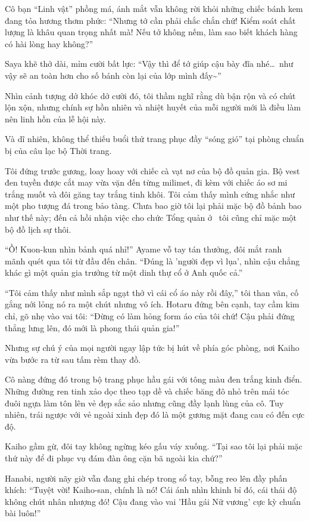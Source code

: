 \documentclass[../main.tex]{subfiles}
\begin{document}
Cô bạn ``Linh vật'' phồng má, ánh mắt vẫn không rời khỏi những chiếc bánh kem đang tỏa hương thơm phức: ``Nhưng tớ cần phải chắc chắn chứ! Kiểm soát chất lượng là khâu quan trọng nhất mà! Nếu tớ không nếm, làm sao biết khách hàng có hài lòng hay không?''

Saya khẽ thở dài, mỉm cười bất lực: ``Vậy thì để tớ giúp cậu bày đĩa nhé\dots\ như vậy sẽ an toàn hơn cho số bánh còn lại của lớp mình đấy\~{}''

Nhìn cảnh tượng dở khóc dở cười đó, tôi thầm nghĩ rằng dù bận rộn và có chút lộn xộn, nhưng chính sự hồn nhiên và nhiệt huyết của mỗi người mới là điều làm nên linh hồn của lễ hội này.

Và dĩ nhiên, không thể thiếu buổi thử trang phục đầy ``sóng gió'' tại phòng chuẩn bị của câu lạc bộ Thời trang.

Tôi đứng trước gương, loay hoay với chiếc cà vạt nơ của bộ đồ quản gia. Bộ vest đen tuyền được cắt may vừa vặn đến từng milimet, đi kèm với chiếc áo sơ mi trắng muốt và đôi găng tay trắng tinh khôi. Tôi cảm thấy mình cứng nhắc như một pho tượng đá trong bảo tàng. Chưa bao giờ tôi lại phải mặc bộ đồ bảnh bao như thế này; đến cả hồi nhận việc cho chức Tổng quản ở \hll\ tôi cũng chỉ mặc một bộ đồ lịch sự thôi.

``Ồ! Kuon-kun nhìn bảnh quá nhỉ!'' Ayame vỗ tay tán thưởng, đôi mắt ranh mãnh quét qua tôi từ đầu đến chân. ``Đúng là 'người đẹp vì lụa', nhìn cậu chẳng khác gì một quản gia trưởng từ một dinh thự cổ ở Anh quốc cả.''

``Tôi cảm thấy như mình sắp ngạt thở vì cái cổ áo này rồi đây,'' tôi than vãn, cố gắng nới lỏng nó ra một chút nhưng vô ích. Hotaru đứng bên cạnh, tay cầm kim chỉ, gõ nhẹ vào vai tôi: ``Đừng có làm hỏng form áo của tôi chứ! Cậu phải đứng thẳng lưng lên, đó mới là phong thái quản gia!''

Nhưng sự chú ý của mọi người ngay lập tức bị hút về phía góc phòng, nơi Kaiho vừa bước ra từ sau tấm rèm thay đồ.

Cô nàng đứng đó trong bộ trang phục hầu gái với tông màu đen trắng kinh điển. Những đường ren tinh xảo dọc theo tạp dề và chiếc băng đô nhỏ trên mái tóc đuôi ngựa làm tôn lên vẻ đẹp sắc sảo nhưng cũng đầy lạnh lùng của cô. Tuy nhiên, trái ngược với vẻ ngoài xinh đẹp đó là một gương mặt đang cau có đến cực độ.

Kaiho gầm gừ, đôi tay không ngừng kéo gấu váy xuống. ``Tại sao tôi lại phải mặc thứ này để đi phục vụ đám đàn ông cặn bã ngoài kia chứ?''

Hanabi, người nãy giờ vẫn đang ghi chép trong sổ tay, bỗng reo lên đầy phấn khích: ``Tuyệt vời! Kaiho-san, chính là nó! Cái ánh nhìn khinh bỉ đó, cái thái độ không chút nhân nhượng đó! Cậu đang vào vai 'Hầu gái Nữ vương' cực kỳ chuẩn bài luôn!''
\end{document}
